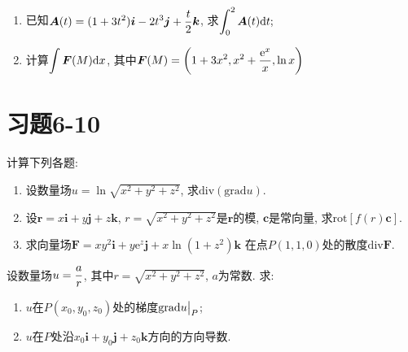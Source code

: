 \begin{yyEx}
	\begin{enumerate}
		\item 已知$\begin{lgathered}
		\bm{A}(t) = (1+3t^2)\bm{i} - 2t^3\bm{j}+\frac{t}{2}\bm{k}
		\end{lgathered}$, 求$\begin{lgathered}
			\int_{0}^{2}\bm{A}(t)\mathrm{d}t;
		\end{lgathered}$
		\item 计算$\begin{lgathered}
			\int \bm{F}(M)\mathrm{d}x
		\end{lgathered}$, 其中$\begin{lgathered}
			\bm{F}(M) = \left( 1+3x^2,x^2+\frac{\mathrm{e}^x}{x},\ln x \right)
		\end{lgathered}$
	\end{enumerate}
\end{yyEx}

\section{习题6-10}

\begin{yyEx}
	计算下列各题:
	\begin{enumerate}
		\item 设数量场$u = \ln\sqrt{x^2+y^2+z^2}$, 求$\mathrm{div}(\mathrm{grad}u)$.
		\item 设$\bm{r}=x\bm{i}+y\bm{j}+z\bm{k}$, $r = \sqrt{x^2+y^2+z^2}$是$\bm{r}$的模, $\bm{c}$是常向量, 求$\mathrm{rot}[f(r)\bm{c}]$.
		\item 求向量场$\bm{F} = xy^2\bm{i}+y\mathrm{e}^z\bm{j}+x\ln(1+z^2)\bm{k}$ 在点$P(1,1,0)$处的散度$\mathrm{div}\bm{F}$.
	\end{enumerate}
\end{yyEx}
	
\begin{yyEx}
	设数量场$\begin{lgathered}
	u = \frac{a}{r}
	\end{lgathered}$, 其中$r = \sqrt{x^2+y^2+z^2}$, $a$为常数. 求:
	\begin{enumerate}
		\item $u$在$P(x_0,y_0,z_0)$处的梯度$\begin{lgathered}\mathrm{grad}u\big\vert_{P}\end{lgathered}$;
		\item $u$在$P$处沿$x_0\bm{i}+y_0\bm{j}+z_0\bm{k}$方向的方向导数.
	\end{enumerate}
\end{yyEx}
	
